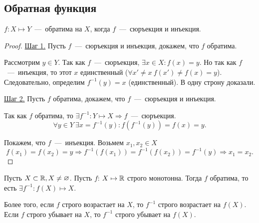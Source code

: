 \subsection{Обратная функция}

\begin{lemma}
    $f: X \mapsto Y$~---~обратима на $X$, когда $f$~---~сюръекция и инъекция.
\end{lemma}
\begin{proof}
    
    \underline{Шаг 1.} Пусть $f$~---~сюръекция и инъекция, докажем, что $f$ обратима. 
    
    Рассмотрим $y \in Y$. Так как $f$~---~сюръекция, $\exists x\in X: f(x) = y.$ Но так как $f$~---~инъекция, то этот $x$ единственный ($\forall x' \neq x \ f(x') \neq f(x) = y$). Следовательно, определим $f^{-1}(y) = x$ (единственный). В одну строну доказали.

    \underline{Шаг 2.} Пусть $f$ обратима, докажем, что $f$~---~сюръекция и инъекция.

    Так как $f$ обратима, то $\exists f^{-1}: Y \mapsto X \Rightarrow f$~---~сюръекция.
    $$\forall y \in Y \ \exists x = f^{-1}(y): f(f^{-1}(y)) = f(x) = y.$$

    Покажем, что $f$~---~инъекция. Возьмем $x_{1}, x_{2} \in X$
    $$ f(x_{1}) = f(x_{2}) = y \Rightarrow f^{-1}(f(x_{1})) = f^{-1}(f(x_{2})) = f^{-1}(y) \Rightarrow x_{1} = x_{2}.
    $$
\end{proof}

\begin{lemma}
    Пусть $X \subset \mathbb{R}, X \neq \varnothing$. Пусть $f$: $X \mapsto \mathbb{R}$ строго монотонна. Тогда $f$ обратима, то есть $\exists f^{-1}: f(X) \mapsto X.$

    Более того, если $f$ строго возрастает на $X$, то $f^{-1}$ строго возрастает на $f(X)$. Если $f$ строго убывает на $X$, то $f^{-1}$ строго убывает на $f(X)$.
\end{lemma}


